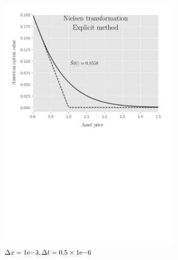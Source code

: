 \begin{figure}[tbp]
\begin{subfigure}{0.4\textwidth}
    \includegraphics[width=\textwidth]{chapters/chapter3/TestCase3ExplicitNielsen.pdf}
    \caption{$\Delta{x}={1}\mathrm{e}{-3}, \Delta{t}=0.5\times{1}\mathrm{e}{-6}$}
    \label{fig:finitedifferencesschemes:numericaresults:test_case_4_explicit_nielsen}
  \end{subfigure}
  \hspace{0.5cm}
  \begin{subfigure}{0.4\textwidth}
    \label{fig:finitedifferencesschemes:numericaresults:test_case_4_implicit_nielsen}
    \centering

\end{subfigure}
\end{figure}
